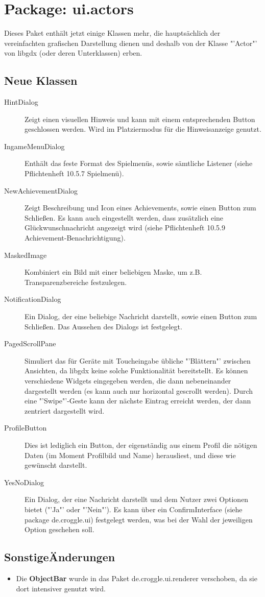 \section{Package: ui.actors}

Dieses Paket enthält jetzt einige Klassen mehr, die hauptsächlich der vereinfachten grafischen Darstellung dienen und deshalb von der Klasse "'Actor"' von libgdx (oder deren Unterklassen) erben. 

\subsection{Neue Klassen}

\begin{description}
\item[HintDialog] Zeigt einen visuellen Hinweis und kann mit einem entsprechenden Button geschlossen werden. Wird im Platziermodus für die Hinweisanzeige genutzt.
\item[IngameMenuDialog] Enthält das feste Format des Spielmenüs, sowie sämtliche Listener (siehe Pflichtenheft 10.5.7 Spielmenü).
\item[NewAchievementDialog] Zeigt Beschreibung und Icon eines Achievements, sowie einen Button zum Schließen. Es kann auch eingestellt werden, dass zusätzlich eine Glückwunschnachricht angezeigt wird (siehe Pflichtenheft 10.5.9 Achievement-Benachrichtigung).
\item[MaskedImage] Kombiniert ein Bild mit einer beliebigen Maske, um z.B. Transparenzbereiche festzulegen. 
\item[NotificationDialog] Ein Dialog, der eine beliebige Nachricht darstellt, sowie einen Button zum Schließen. Das Aussehen des Dialogs ist festgelegt.
\item[PagedScrollPane] Simuliert das für Geräte mit Toucheingabe übliche "'Blättern"' zwischen Ansichten, da libgdx keine solche Funktionalität bereitstellt. Es können verschiedene Widgets eingegeben werden, die dann nebeneinander dargestellt werden (es kann auch nur horizontal gescrollt werden). Durch eine "'Swipe"'-Geste kann der nächste Eintrag erreicht werden, der dann zentriert dargestellt wird.
\item[ProfileButton] Dies ist lediglich ein Button, der eigenständig aus einem Profil die nötigen Daten (im Moment Profilbild und Name) herausliest, und diese wie gewünscht darstellt.
\item[YesNoDialog] Ein Dialog, der eine Nachricht darstellt und dem Nutzer zwei Optionen bietet ("'Ja"' oder "'Nein"'). Es kann über ein ConfirmInterface (siehe package de.croggle.ui) festgelegt werden, was bei der Wahl der jeweiligen Option geschehen soll.
\end{description}

\subsection{SonstigeÄnderungen}

\begin{itemize}
\item Die \textbf{ObjectBar} wurde in das Paket de.croggle.ui.renderer verschoben, da sie dort intensiver genutzt wird. 
\end{itemize}
